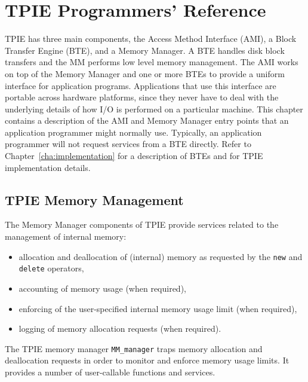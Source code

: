 \chapter{TPIE Programmers' Reference}
\label{cha:reference}



TPIE has three main components, the Access Method Interface
(AMI), a Block Transfer Engine (BTE), and a Memory Manager.
A BTE handles disk block transfers and the MM performs low
level memory management. The AMI works on top of the Memory
Manager and one or more BTEs to provide a uniform interface
for application programs. Applications that use this
interface are portable across hardware platforms, since they
never have to deal with the underlying details of how I/O is
performed on a particular machine. This chapter contains a
description of the AMI and Memory Manager entry points that
an application programmer might normally use. Typically, an
application programmer will not request services from a BTE
directly. Refer to Chapter~\ref{cha:implementation} for a
description of BTEs and for TPIE implementation details.


\section{TPIE Memory Management}
\label{sec:mm-ref}

The Memory Manager components of TPIE provide services related to
the management of internal memory:
\begin{itemize}
\item allocation and deallocation of (internal)
memory as requested by the \verb|new| and \verb|delete| operators,
\item accounting of memory usage (when required),
\item enforcing of the user-specified internal memory usage
limit (when required),
\item logging of memory allocation requests (when required).
\end{itemize}

The TPIE memory manager \verb|MM_manager| traps memory
allocation and deallocation requests in order to monitor
and enforce memory usage limits. It provides a number of
user-callable functions and services.


